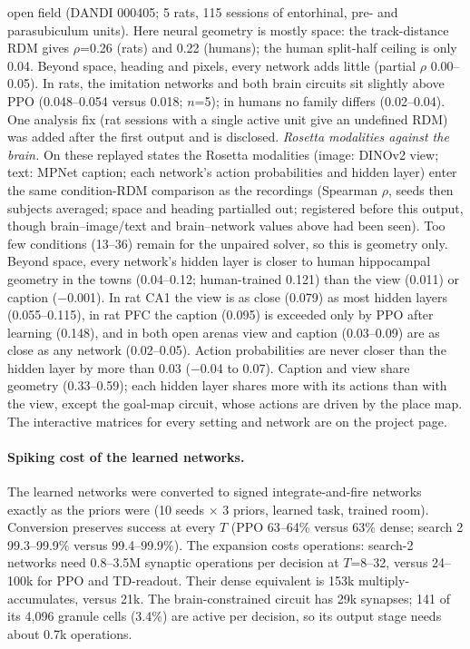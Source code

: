 \documentclass[10pt,onecolumn,letterpaper]{article}
\begin{document}
open field (DANDI 000405; 5 rats, 115 sessions of entorhinal, pre- and parasubiculum units). Here neural geometry is mostly
space: the track-distance RDM gives $\rho$=0.26 (rats) and 0.22 (humans); the human split-half ceiling is only 0.04. Beyond
space, heading and pixels, every network adds little (partial $\rho$ 0.00--0.05). In rats, the imitation networks and both
brain circuits sit slightly above PPO (0.048--0.054 versus 0.018; $n$=5); in humans no family differs (0.02--0.04). One
analysis fix (rat sessions with a single active unit give an undefined RDM) was added after the first output and is disclosed.
\emph{Rosetta modalities against the brain.} On these replayed states the Rosetta modalities (image: DINOv2 view; text: MPNet
caption; each network's action probabilities and hidden layer) enter the same condition-RDM comparison as the recordings (Spearman
$\rho$, seeds then subjects averaged; space and heading partialled out; registered before this output, though brain--image/text
and brain--network values above had been seen). Too few conditions (13--36) remain for the unpaired solver, so this is geometry
only. Beyond space, every network's hidden layer is closer to human hippocampal geometry in the towns (0.04--0.12; human-trained
0.121) than the view (0.011) or caption ($-$0.001). In rat CA1 the view is as close (0.079) as most hidden layers (0.055--0.115),
in rat PFC the caption (0.095) is exceeded only by PPO after learning (0.148), and in both open arenas view and caption (0.03--0.09)
are as close as any network (0.02--0.05). Action probabilities are never closer than the hidden layer by more than 0.03
($-$0.04 to 0.07). Caption and view share geometry (0.33--0.59); each hidden layer shares more with its actions than with the view,
except the goal-map circuit, whose actions are driven by the place map.
The interactive matrices for every setting and network are on the project page.

\paragraph{Spiking cost of the learned networks.} The learned networks were converted to signed integrate-and-fire
networks exactly as the priors were (10 seeds $\times$ 3 priors, learned task, trained room). Conversion preserves
success at every $T$ (PPO 63--64\% versus 63\% dense; search 2 99.3--99.9\% versus 99.4--99.9\%). The expansion
costs operations: search-2 networks need 0.8--3.5M synaptic operations per decision at $T$=8--32, versus 24--100k for PPO
and TD-readout. Their dense equivalent is 153k multiply-accumulates, versus 21k. The brain-constrained circuit
has 29k synapses; 141 of its 4,096 granule cells (3.4\%) are active per decision, so its output stage needs about 0.7k operations.
\end{document}
